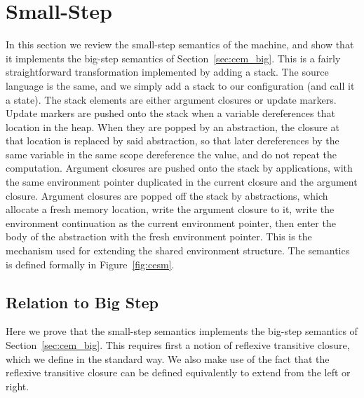 \section{Small-Step \ce} \label{sec:cem_small}

In this section we review the small-step semantics of the \ce 
machine, and show that it implements the big-step semantics of
Section~\ref{sec:cem_big}. This is a fairly straightforward transformation implemented
by adding a stack. The source language is the same, and we simply add a stack to
our configuration (and call it a state). The stack elements are either argument
closures or update markers. Update markers are pushed onto the stack when a
variable dereferences that location in the heap. When they are popped by an
abstraction, the closure at that location is replaced by said abstraction, so
that later dereferences by the same variable in the same scope dereference the
value, and do not repeat the computation.  Argument closures are pushed onto the
stack by applications, with the same environment pointer duplicated in the
current closure and the argument closure.  Argument closures are popped off the
stack by abstractions, which allocate a fresh memory location, write the
argument closure to it, write the environment continuation as the current
environment pointer, then enter the body of the abstraction with the fresh
environment pointer. This is the mechanism used for extending the shared
environment structure. The semantics is defined formally in
Figure~\ref{fig:cesm}.  

\subsection{Relation to Big Step} \label{sec:cem_cesm}
Here we prove that the small-step semantics implements the big-step semantics of
Section~\ref{sec:cem_big}. This requires first a notion of reflexive transitive closure,
which we define in the standard way. We also make use of the fact that the
reflexive transitive closure can be defined equivalently to extend from the left
or right. 

